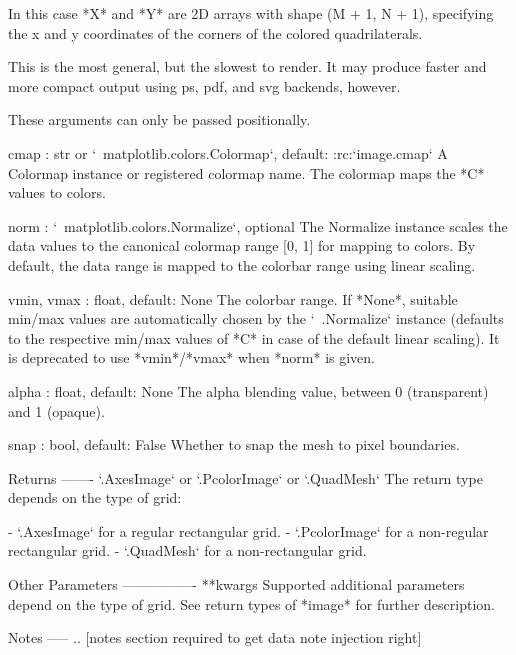 \begin{DoxyVerb}
\begin{DoxyVerb}
      In this case *X* and *Y* are 2D arrays with shape (M + 1, N + 1),
      specifying the x and y coordinates of the corners of the colored
      quadrilaterals.

      This is the most general, but the slowest to render.  It may
      produce faster and more compact output using ps, pdf, and
      svg backends, however.

    These arguments can only be passed positionally.

cmap : str or `~matplotlib.colors.Colormap`, default: :rc:`image.cmap`
    A Colormap instance or registered colormap name. The colormap
    maps the *C* values to colors.

norm : `~matplotlib.colors.Normalize`, optional
    The Normalize instance scales the data values to the canonical
    colormap range [0, 1] for mapping to colors. By default, the data
    range is mapped to the colorbar range using linear scaling.

vmin, vmax : float, default: None
    The colorbar range. If *None*, suitable min/max values are
    automatically chosen by the `~.Normalize` instance (defaults to
    the respective min/max values of *C* in case of the default linear
    scaling).
    It is deprecated to use *vmin*/*vmax* when *norm* is given.

alpha : float, default: None
    The alpha blending value, between 0 (transparent) and 1 (opaque).

snap : bool, default: False
    Whether to snap the mesh to pixel boundaries.

Returns
-------
`.AxesImage` or `.PcolorImage` or `.QuadMesh`
    The return type depends on the type of grid:

    - `.AxesImage` for a regular rectangular grid.
    - `.PcolorImage` for a non-regular rectangular grid.
    - `.QuadMesh` for a non-rectangular grid.

Other Parameters
----------------
**kwargs
    Supported additional parameters depend on the type of grid.
    See return types of *image* for further description.

Notes
-----
.. [notes section required to get data note injection right]
\end{DoxyVerb}
 \mbox{\label{classmatplotlib_1_1axes_1_1__axes_1_1Axes_ad65860a26dde3a86bf9c9112dd1079fd}} 

\end{DoxyVerb}
